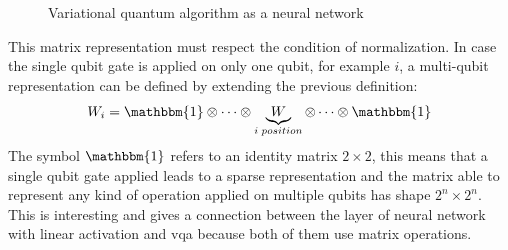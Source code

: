 \begin{center}
	\begin{figure}[!h]
		\centering
		\caption{Variational quantum algorithm as a neural network}
		\label{vqa nn}
	\end{figure}
\end{center}
This matrix representation must respect the condition of normalization. In case the single qubit gate is applied on only one qubit, for example $i$, a multi-qubit representation can be defined by extending the previous definition:
\begin{equation*}
	W_i = \mathbbm{1} \otimes \dots \otimes \underbrace{W}_{i\;position} \otimes \dots \otimes \mathbbm{1}
\end{equation*}
The symbol $\mathbbm{1}$ refers to an identity matrix $2\times2$, this means that a single qubit gate applied leads to a sparse representation and the matrix able to represent any kind of operation applied on multiple qubits has shape $2^n \times 2^n$. This is interesting and gives a connection between the layer of neural network with linear activation and \acrshort{vqa} because both of them use matrix operations.
